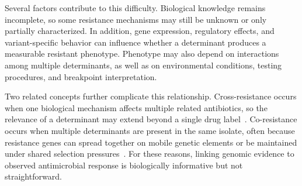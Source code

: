 Several factors contribute to this difficulty. Biological knowledge remains incomplete, so some resistance mechanisms may still be unknown or only partially characterized. In addition, gene expression, regulatory effects, and variant-specific behavior can influence whether a determinant produces a measurable resistant phenotype. Phenotype may also depend on interactions among multiple determinants, as well as on environmental conditions, testing procedures, and breakpoint interpretation.

Two related concepts further complicate this relationship. Cross-resistance occurs when one biological mechanism affects multiple related antibiotics, so the relevance of a determinant may extend beyond a single drug label~\citep{munita2016mechanisms}. Co-resistance occurs when multiple determinants are present in the same isolate, often because resistance genes can spread together on mobile genetic elements or be maintained under shared selection pressures~\citep{vonwintersdorff2016dissemination}. For these reasons, linking genomic evidence to observed antimicrobial response is biologically informative but not straightforward.
